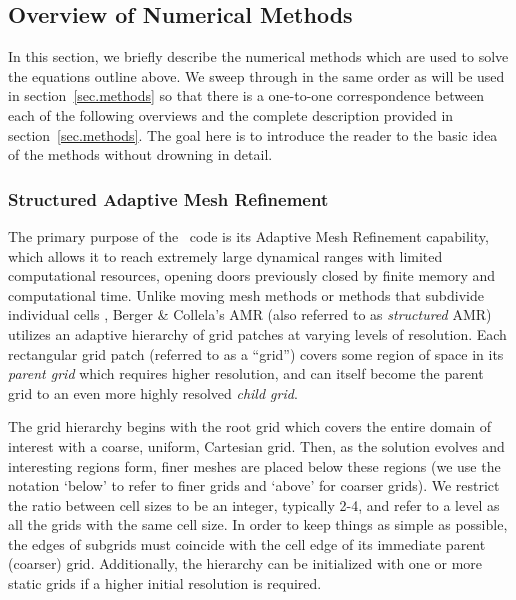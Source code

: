 
\subsection{Overview of Numerical Methods}

In this section, we briefly describe the numerical methods which are used to solve the equations outline above.  We sweep through in the same order as will be used in section~\ref{sec.methods} so that there is a one-to-one correspondence between each of the following overviews and the complete description provided in section~\ref{sec.methods}.  The goal here is to introduce the reader to the basic idea of the methods without drowning in detail.

\subsubsection{Structured Adaptive Mesh Refinement}

The primary purpose of the \enzo\ code is its Adaptive Mesh Refinement
capability, which allows it to reach extremely large dynamical ranges
with limited computational resources, opening doors previously closed
by finite memory and computational time. Unlike moving mesh methods
\citep{1995ApJS..100..269P,1995ApJS...97..231G} or  
methods that subdivide 
individual cells \citep{Adjerid}, Berger \& Collela's AMR (also referred 
to as \emph{structured} AMR) utilizes an adaptive hierarchy of grid 
patches at varying levels of resolution.  Each rectangular grid patch 
(referred to as a ``grid'') covers some region of space in its 
\emph{parent grid} which requires higher resolution, and can itself 
become the parent grid to an even more highly resolved \emph{child grid}. 

The grid hierarchy begins with the root grid which covers the entire
domain of interest with a coarse, uniform, Cartesian grid. Then, as
the solution evolves and interesting regions form, finer meshes are
placed below these regions (we use the notation `below' to refer to
finer grids and `above' for coarser grids).  We restrict the ratio
between cell sizes to be an integer, typically 2-4, and refer to a
level as all the grids with the same cell size.  In order to keep
things as simple as possible, the edges of subgrids must coincide with
the cell edge of its immediate parent (coarser) grid. Additionally,
the hierarchy can be initialized with one or more static grids if a
higher initial resolution is required.

